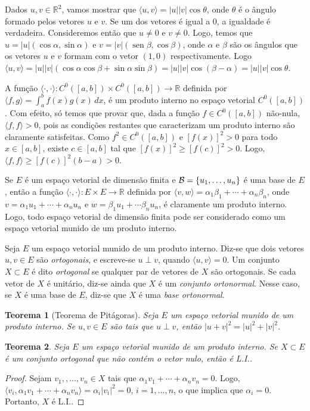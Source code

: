\documentclass[12pt,a4paper]{article}
\newcommand{\ang}[1]{\langle#1\rangle}
\newcommand{\R}{\mathbb{R}}
\newtheorem{thm}{Teorema}[section]
\theoremstyle{definition}
\DeclareMathOperator{\sen}{sen}
\begin{document}
Dados $u,v\in\R^2$, vamos mostrar que $\ang{u,v}=|u||v|\cos\theta$,
onde $\theta$ é o ângulo formado pelos vetores $u$ e $v$. Se um dos
vetores é igual a $0$, a igualdade é verdadeira. Consideremos então
que $u\ne 0$ e $v\ne 0$. Logo, temos que
$u=|u|(\cos\alpha,\sin\alpha)$ e $v=|v|(\sen\beta,\cos\beta)$, onde
$\alpha$ e $\beta$ são os ângulos que os vetores $u$ e $v$ formam com
o vetor $(1,0)$ respectivamente. Logo
$\ang{u,v}=|u||v|(\cos\alpha\cos\beta+\sin\alpha\sin\beta)=|u||v|\cos(\beta-\alpha)=|u||v|\cos\theta$.

A função $\ang{\cdot,\cdot}:C^0([a,b])\times C^0([a,b])\to\R$ definida
por $\ang{f,g}=\int_a^bf(x)g(x)\,dx$, é um produto interno no espaço
vetorial $C^0([a,b])$. Com efeito, só temos que provar que, dada a
função $f\in C^0([a,b])$ não-nula, $\ang{f,f}>0$, pois as condições
restantes que caracterizam um produto interno são claramente
satisfeitas. Como $f^2\in C^0([a,b])$ e $[f(x)]^2>0$ para todo
$x\in [a,b]$, existe $c\in[a,b]$ tal que $[f(x)]^2\ge
[f(c)]^2>0$. Logo, $\ang{f,f}\ge [f(c)]^2(b-a)>0$.

Se $E$ é um espaço vetorial de dimensão finita e
${\cal B}=\{u_1,\ldots,u_n\}$ é uma base de $E$, então a função
$\ang{\cdot,\cdot}:E\times E\to \R$ definida por
$\ang{v,w}=\alpha_1\beta_1+\cdots+\alpha_n\beta_n$, onde
$v=\alpha_1u_1+\cdots+\alpha_nu_n$ e $w=\beta_1u_1+\cdots\beta_nu_n$,
é claramente um produto interno. Logo, todo espaço vetorial de
dimensão finita pode ser considerado como um espaço vetorial munido de
um produto interno.

Seja $E$ um espaço vetorial munido de um produto interno. Diz-se que
dois vetores $u,v\in E$ são \textit{ortogonais}, e escreve-se
$u\perp v$, quando $\ang{u,v}=0$. Um conjunto $X\subset E$ é dito
\textit{ortogonal} se qualquer par de vetores de $X$ são
ortogonais. Se cada vetor de $X$ é unitário, diz-se ainda que $X$ é um
\textit{conjunto ortonormal}. Nesse caso, se $X$ é uma base de $E$,
diz-se que $X$ é uma \textit{base ortonormal}.

\begin{thm}[Teorema de Pitágoras]
  Seja $E$ um espaço vetorial munido de um produto interno. Se
  $u,v\in E$ são tais que $u\perp v$, então $|u+v|^2=|u|^2+|v|^2$.
\end{thm}

\begin{thm}
  Seja $E$ um espaço vetorial munido de um produto interno. Se
  $X\subset E$ é um conjunto ortogonal que não contém o vetor nulo,
  então é L.I..
\end{thm}
\begin{proof}
  Sejam $v_1,,\ldots,v_n\in X$ tais que
  $\alpha_1v_1+\cdots+\alpha_nv_n=0$. Logo,
  $\ang{v_i,\alpha_1v_1+\cdots+\alpha_nv_n}=\alpha_i|v_i|^2=0$,
  $i=1,\ldots,n$, o que implica que $\alpha_i=0$. Portanto, $X$ é
  L.I..
\end{proof}
\end{document}
